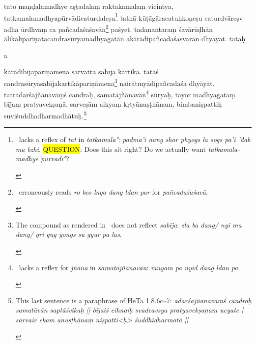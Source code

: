 \documentclass[naipra.tex]{subfiles}
\begin{document}
\begin{sanskrit}

\pstart
tato maṇḍalamadhye aṣṭadalaṃ raktakamalaṃ vicintya, tatkamalamadhyapūrvādicaturdaleṣu\footnote{\begin{english}
	\TIB\ lacks a reflex of \emph{tat} in \emph{tatkamala°}: \emph{padma'i nang shar phyogs la sogs pa'i 'dab ma bzhi}.
	\hl{QUESTION}: Does this sit right? Do we actually want \emph{tatkamalamadhye pūrvādi°}?
\end{english}} tathā kūṭāgāracatuḥkoṇeṣu caturdvāreṣv adha ūrdhvaṃ ca pañcadaśaśavān\footnote{\begin{english}
	\TIB\ erroneously reads \emph{ro bco lnga dang ldan par} for \emph{pañcadaśaśavā}.
\end{english}} paśyet. 
tadanantaraṃ śavārūḍhān ālikālipariṇatacandrasūryamadhyagatān akārādipañcadaśasvarān dhyāyāt.
tataḥ \begin{mantra}a\end{mantra}\dsh kārādibījapariṇāmena sarvatra sabījā kartikā.
tataś candrasūryasabījakartikāpariṇāmena\footnote{\begin{english}
	The compound as rendered in \TIB\ does not reflect \emph{sabīja}: \emph{zla ba dang/ nyi ma dang/ gri gug yongs su gyur pa las}.
\end{english}} nairātmyādipañcadaśa dhyāyāt. 
tatrādarśajñānavāṃś candraḥ, samatājñānavān\footnote{\begin{english}
	\TIB\ lacks a reflex for \emph{jñāna} in \emph{samatājñānavān}: \emph{mnyam pa nyid dang ldan pa}. 
\end{english}} sūryaḥ, tayor madhyagataṃ bījaṃ pratyavekṣaṇā, sarveṣām aikyaṃ kṛtyānuṣṭhānam, bimbaniṣpattiḥ suviśuddhadharmadhātuḥ.\footnote{\begin{english}
	This last sentence is a paraphrase of HeTa 1.8.6c–7: \emph{ādarśajñānavāṃś candraḥ samatāvān saptāśvikaḥ || bījaiś cihnaiḥ svadeavsya pratyavekṣaṇam ucyate | sarvair ekam anusṭhānaṃ niṣpatti<ḥ> śuddhidharmatā ||} 
\end{english}}
\pend


\end{sanskrit}
\end{document}
